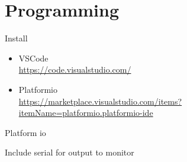 \documentclass[a4paper, 12pt]{article}
\begin{document}
\section{Programming}

Install 

\begin{itemize}
  \item VSCode \\
  \url{https://code.visualstudio.com/}
  \item Platformio \\
  \url{https://marketplace.visualstudio.com/items?itemName=platformio.platformio-ide}
\end{itemize}



Platform io

Include serial for output to monitor
\end{document}
